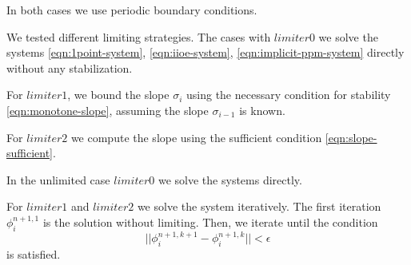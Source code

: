 \documentclass[../thesis.tex]{subfiles}
\begin{document}
In both cases we use periodic boundary conditions.

We tested different limiting strategies. The cases with \(limiter0\) we solve the systems \eqref{eqn:1point-system}, \eqref{eqn:iioe-system}, \eqref{eqn:implicit-ppm-system} directly without any stabilization.

For \(limiter1\), we bound the slope \(\sigma_{i}\) using the necessary condition for stability \eqref{eqn:monotone-slope}, assuming the slope \(\sigma_{i-1}\) is known.

For \(limiter2\) we compute the slope using the sufficient condition \eqref{eqn:slope-sufficient}.

In the unlimited case \(limiter0\) we solve the systems directly.

For \(limiter1\) and \(limiter2\) we solve the system iteratively. The first iteration \(\phi_{i}^{n+1,1}\) is the solution without limiting. Then, we iterate until the condition
\[
    ||\phi_{i}^{n+1,k+1} - \phi_{i}^{n+1,k}|| < \epsilon
\]
is satisfied.
\end{document}
